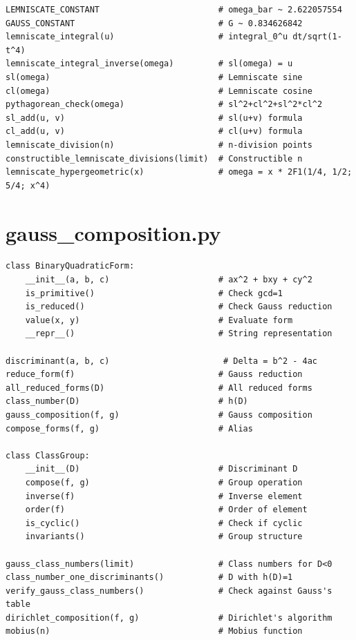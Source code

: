 \begin{lstlisting}[style=python]
LEMNISCATE_CONSTANT                        # omega_bar ~ 2.622057554
GAUSS_CONSTANT                             # G ~ 0.834626842
lemniscate_integral(u)                     # integral_0^u dt/sqrt(1-t^4)
lemniscate_integral_inverse(omega)         # sl(omega) = u
sl(omega)                                  # Lemniscate sine
cl(omega)                                  # Lemniscate cosine
pythagorean_check(omega)                   # sl^2+cl^2+sl^2*cl^2
sl_add(u, v)                               # sl(u+v) formula
cl_add(u, v)                               # cl(u+v) formula
lemniscate_division(n)                     # n-division points
constructible_lemniscate_divisions(limit)  # Constructible n
lemniscate_hypergeometric(x)               # omega = x * 2F1(1/4, 1/2; 5/4; x^4)
\end{lstlisting}

\section{gauss\_composition.py}

\begin{lstlisting}[style=python]
class BinaryQuadraticForm:
    __init__(a, b, c)                      # ax^2 + bxy + cy^2
    is_primitive()                         # Check gcd=1
    is_reduced()                           # Check Gauss reduction
    value(x, y)                            # Evaluate form
    __repr__()                             # String representation

discriminant(a, b, c)                       # Delta = b^2 - 4ac
reduce_form(f)                             # Gauss reduction
all_reduced_forms(D)                       # All reduced forms
class_number(D)                            # h(D)
gauss_composition(f, g)                    # Gauss composition
compose_forms(f, g)                        # Alias

class ClassGroup:
    __init__(D)                            # Discriminant D
    compose(f, g)                          # Group operation
    inverse(f)                             # Inverse element
    order(f)                               # Order of element
    is_cyclic()                            # Check if cyclic
    invariants()                           # Group structure

gauss_class_numbers(limit)                 # Class numbers for D<0
class_number_one_discriminants()           # D with h(D)=1
verify_gauss_class_numbers()               # Check against Gauss's table
dirichlet_composition(f, g)                # Dirichlet's algorithm
mobius(n)                                  # Mobius function
\end{lstlisting}

